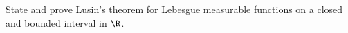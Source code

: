 State and prove Lusin's theorem for Lebesgue measurable functions on
a closed and bounded interval in $\R$. 
